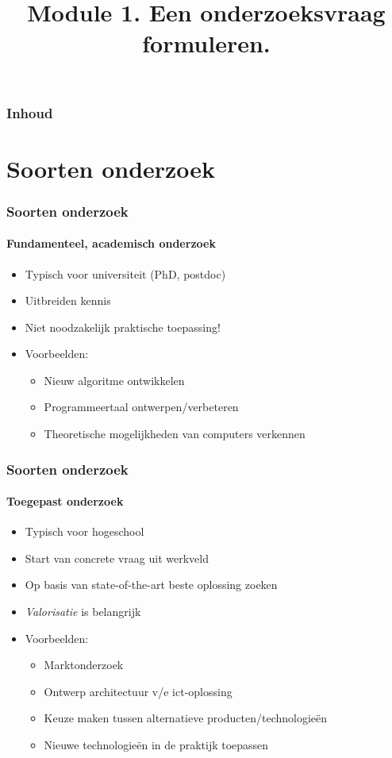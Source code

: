 \documentclass[aspectratio=169]{beamer}
\title{Module 1. Een onderzoeksvraag formuleren.}
\subtitle{\coursename}
\author{\lecturers}   %
\date{\academicyear}
\begin{document}
\begin{frame}
  \maketitle
\end{frame}

\begin{frame}
  \frametitle{Inhoud}

  \tableofcontents
\end{frame}

\section{Soorten onderzoek}

\begin{frame}
  \frametitle{Soorten onderzoek}
  \framesubtitle{Fundamenteel, academisch onderzoek}

  \begin{itemize}
    \item Typisch voor universiteit (PhD, postdoc)
    \item Uitbreiden kennis
    \item Niet noodzakelijk praktische toepassing!
    \item Voorbeelden:
          \begin{itemize}
            \item Nieuw algoritme ontwikkelen
            \item Programmeertaal ontwerpen/verbeteren
            \item Theoretische mogelijkheden van computers verkennen
          \end{itemize}
  \end{itemize}

\end{frame}

\begin{frame}
  \frametitle{Soorten onderzoek}
  \framesubtitle{Toegepast onderzoek}

  \begin{itemize}
    \item Typisch voor hogeschool
    \item Start van concrete vraag uit werkveld
    \item Op basis van state-of-the-art beste oplossing zoeken
    \item \textit{Valorisatie} is belangrijk
    \item Voorbeelden:
          \begin{itemize}
            \item Marktonderzoek
            \item Ontwerp architectuur v/e ict-oplossing
            \item Keuze maken tussen alternatieve producten/technologieën
            \item Nieuwe technologieën in de praktijk toepassen
          \end{itemize}
  \end{itemize}

\end{frame}
\end{document}
